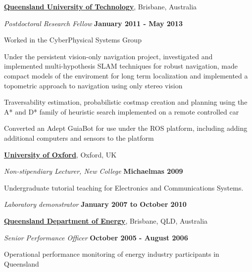 \documentclass[10pt]{article}
\newenvironment{outerlist}[1][\enskip\textbullet]%
        {\begin{itemize}[#1]}{\end{itemize}%
         \vspace{-.6\baselineskip}}
\newenvironment{innerlist}[1][\enskip\textbullet]%
        {\begin{compactitem}[#1]}{\end{compactitem}}
\newcommand{\blankline}{\quad\pagebreak[2]}
\begin{document}
\href{http://www.qut.edu.au}{\textbf{Queensland University of Technology}}, 
Brisbane, Australia
\begin{outerlist}
\item[] \textit{Postdoctoral Research Fellow} \hfill \textbf{January 2011 - May 2013}
\begin{innerlist}
\item{Worked in the CyberPhysical Systems Group}
\item{Under the persistent vision-only navigation project, investigated and implemented multi-hypothesis SLAM
techniques for robust navigation, made compact models of the
enviroment for long term localization and implemented a topometric approach to navigation using only stereo vision}
\item{Traversability estimation, probabilistic costmap creation and planning using the A* and D* family of heuristic
search implemented on a remote controlled car}
\item{Converted an Adept GuiaBot for use under the ROS platform, including adding additional computers and sensors to
the platform} 
\end{innerlist}
\end{outerlist}

\blankline

\href{http://www.ox.ac.uk}{\textbf{University of Oxford}}, 
Oxford, UK
%
\begin{outerlist}

\item[] \textit{Non-stipendiary Lecturer, New College}%
        \hfill \textbf{Michaelmas 2009}
	\begin{innerlist}
	\item Undergraduate tutorial teaching for Electronics and Communications Systems.
    \end{innerlist}

\item[] \textit{Laboratory demonstrator}%
        \hfill \textbf{January 2007 to October 2010}
\end{outerlist}

\blankline

%
\href{http://www.energy.qld.gov.au/}{\textbf{Queensland Department of Energy}}, 
Brisbane, QLD, Australia

\begin{outerlist}
\item[] \textit{Senior Performance Officer}%
        \hfill \textbf{October 2005 - August 2006}
\begin{innerlist}
\item Operational performance monitoring of energy industry participants in Queensland
\end{innerlist}
\end{outerlist}
\end{document}
